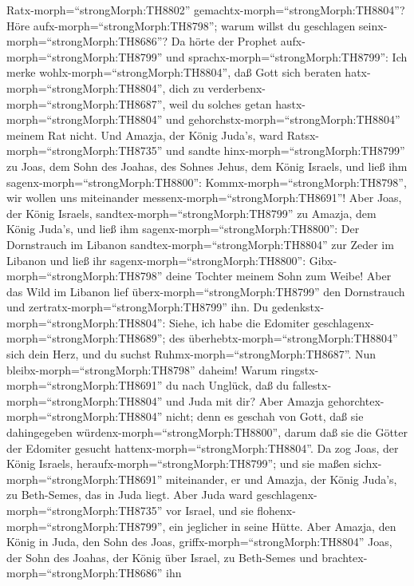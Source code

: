 Ratx-morph=``strongMorph:TH8802'' gemachtx-morph=``strongMorph:TH8804''?
Höre aufx-morph=``strongMorph:TH8798''; warum willst du geschlagen
seinx-morph=``strongMorph:TH8686''? Da hörte der Prophet
aufx-morph=``strongMorph:TH8799'' und
sprachx-morph=``strongMorph:TH8799'': Ich merke
wohlx-morph=``strongMorph:TH8804'', daß Gott sich beraten
hatx-morph=``strongMorph:TH8804'', dich zu
verderbenx-morph=``strongMorph:TH8687'', weil du solches getan
hastx-morph=``strongMorph:TH8804'' und
gehorchstx-morph=``strongMorph:TH8804'' meinem Rat nicht. 
Und Amazja, der König Juda's, ward Ratsx-morph=``strongMorph:TH8735''
und sandte hinx-morph=``strongMorph:TH8799'' zu Joas, dem Sohn des
Joahas, des Sohnes Jehus, dem König Israels, und ließ ihm
sagenx-morph=``strongMorph:TH8800'': Kommx-morph=``strongMorph:TH8798'',
wir wollen uns miteinander messenx-morph=``strongMorph:TH8691''!
 Aber Joas, der König Israels,
sandtex-morph=``strongMorph:TH8799'' zu Amazja, dem König Juda's, und
ließ ihm sagenx-morph=``strongMorph:TH8800'': Der Dornstrauch im Libanon
sandtex-morph=``strongMorph:TH8804'' zur Zeder im Libanon und ließ ihr
sagenx-morph=``strongMorph:TH8800'': Gibx-morph=``strongMorph:TH8798''
deine Tochter meinem Sohn zum Weibe! Aber das Wild im Libanon lief
überx-morph=``strongMorph:TH8799'' den Dornstrauch und
zertratx-morph=``strongMorph:TH8799'' ihn.  Du
gedenkstx-morph=``strongMorph:TH8804'': Siehe, ich habe die Edomiter
geschlagenx-morph=``strongMorph:TH8689''; des
überhebtx-morph=``strongMorph:TH8804'' sich dein Herz, und du suchst
Ruhmx-morph=``strongMorph:TH8687''. Nun
bleibx-morph=``strongMorph:TH8798'' daheim! Warum
ringstx-morph=``strongMorph:TH8691'' du nach Unglück, daß du
fallestx-morph=``strongMorph:TH8804'' und Juda mit dir? 
Aber Amazja gehorchtex-morph=``strongMorph:TH8804'' nicht; denn es
geschah von Gott, daß sie dahingegeben
würdenx-morph=``strongMorph:TH8800'', darum daß sie die Götter der
Edomiter gesucht hattenx-morph=``strongMorph:TH8804''.  Da
zog Joas, der König Israels, heraufx-morph=``strongMorph:TH8799''; und
sie maßen sichx-morph=``strongMorph:TH8691'' miteinander, er und Amazja,
der König Juda's, zu Beth-Semes, das in Juda liegt.  Aber
Juda ward geschlagenx-morph=``strongMorph:TH8735'' vor Israel, und sie
flohenx-morph=``strongMorph:TH8799'', ein jeglicher in seine Hütte.
 Aber Amazja, den König in Juda, den Sohn des Joas,
griffx-morph=``strongMorph:TH8804'' Joas, der Sohn des Joahas, der König
über Israel, zu Beth-Semes und brachtex-morph=``strongMorph:TH8686'' ihn
